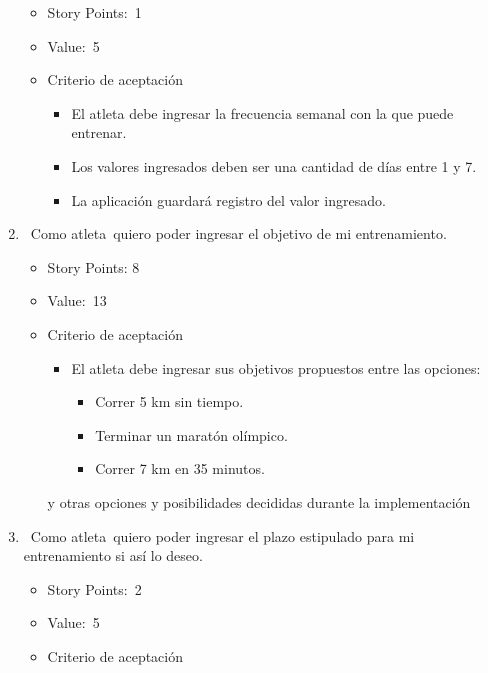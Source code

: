 \begin{enumerate}
  \begin{itemize}
  \item
    Story Points:~1
  \item
    Value:~5
  \item
    Criterio de aceptación

    \begin{itemize}
    \item
      El atleta debe ingresar la frecuencia semanal con la que puede
      entrenar.
    \item
      Los valores ingresados deben ser una cantidad de días entre 1 y 7.
    \item
      La aplicación guardará registro del valor ingresado.
    \end{itemize}
  \end{itemize}
\item
  ~Como atleta~quiero poder ingresar el objetivo de mi entrenamiento.

  \begin{itemize}
  \item
    Story Points: 8
  \item
    Value:~13
  \item
    Criterio de aceptación

    \begin{itemize}
    \item
      El atleta debe ingresar sus objetivos propuestos entre las
      opciones:

      \begin{itemize}
      \item
        Correr 5 km sin tiempo.
      \item
        Terminar un maratón olímpico.
      \item
        Correr 7 km en 35 minutos.
      \end{itemize}
    \end{itemize}

    y otras opciones y posibilidades decididas durante la implementación
  \end{itemize}
\item
  ~Como atleta~quiero poder ingresar el plazo estipulado para mi
  entrenamiento si así lo deseo.

  \begin{itemize}
  \item
    Story Points:~2
  \item
    Value:~5
  \item
    Criterio de aceptación


\end{itemize}
\end{enumerate}
